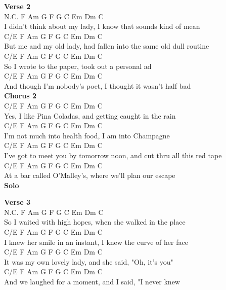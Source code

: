 \documentclass[a4paper]{article}
\begin{document}
{{        }
        \textbf{Verse 2}
        ~\\
        {
            \cutive
            \obeyspaces
N.C.                       F  Am G F             G              C Em Dm C
\\
I didn't think about my lady,     I know that sounds kind of mean
\\
           C/E     F  Am G F            G         C        Em  Dm  C
\\
But me and my old lady,      had fallen into the same old dull routine
\\
      C/E          F   Am G F             G       C Em Dm C
\\
So I wrote to the paper,      took out a personal ad
\\
               C/E       F  Am G F              G           C Em Dm C
\\
And though I'm nobody's poet,     I thought it wasn't half bad
\\

        }
        \textbf{Chorus 2}
        ~\\
        {
            \cutive
            \obeyspaces
             C/E    F  Am G F             G             C Em Dm C
\\
Yes, I like Pina Coladas,    and getting caught in the rain
\\
        C/E         F        Am G F      G         C Em Dm C
\\
I'm not much into health food,      I am into Champagne
\\
            C/E            F         Am G F              G            C Em Dm C
\\
I've got to meet you by tomorrow noon,     and cut thru all this red tape
\\
     C/E           F      Am G F              G         C Em Dm C
\\
At a bar called O'Malley's,     where we'll plan our escape
\\

        }
        \textbf{Solo}
        ~\\
        {
            \cutive
            \obeyspaces

        }
        \textbf{Verse 3}
        ~\\
        {
            \cutive
            \obeyspaces
N.C.                F       Am G F           G              C Em Dm C
\\
So I waited with high hopes,     when she walked in the place
\\
            C/E         F     Am G F            G            C Em Dm C
\\
I knew her smile in an instant,     I knew the curve of her face
\\
          C/E         F  Am G F          G               C Em Dm C
\\
It was my own lovely lady,      and she said, "Oh, it's you"
\\
        C/E           F    Am G F           G  C        Em Dm C
\\
And we laughed for a moment,      and I said, "I never knew
\\

}}
\end{document}
